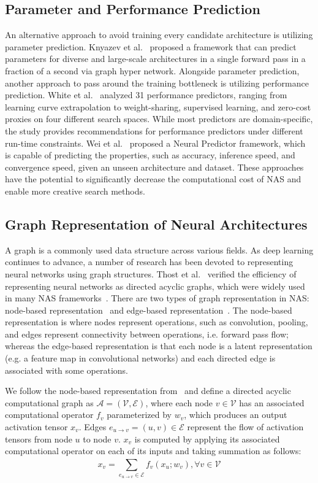 \documentclass{article}
\begin{document}
\subsection{Parameter and Performance Prediction}
An alternative approach to avoid training every candidate architecture is utilizing parameter prediction. Knyazev et al.~\cite{ppuda} proposed a framework that can predict parameters for diverse and large-scale architectures in a single forward pass in a fraction of a second via graph hyper network. Alongside parameter prediction, another approach to pass around the training bottleneck is utilizing performance prediction. White et al.~\cite{performance_predictor} analyzed 31 performance predictors, ranging from learning curve extrapolation to weight-sharing, supervised learning, and zero-cost proxies on four different search spaces. While most predictors are domain-specific, the study provides recommendations for performance predictors under different run-time constraints. Wei et al.~\cite{NeurPred} proposed a Neural Predictor framework, which is capable of predicting the properties, such as accuracy, inference speed, and convergence speed, given an unseen architecture and dataset. These approaches have the potential to significantly decrease the computational cost of NAS and enable more creative search methods. 


\subsection{Graph Representation of Neural Architectures}
A graph is a commonly used data structure across various fields. As deep learning continues to advance, a number of research has been devoted to representing neural networks using graph structures. Thost et al.~\cite{DAG_GNN} verified the efficiency of representing neural networks as directed acyclic graphs, which were widely used in many NAS frameworks~\cite{ppuda, DARTS, GHN}. There are two types of graph representation in NAS: node-based representation~\cite{ppuda, ENAS, GHN} and edge-based representation~\cite{NAS-Bench-Graph, DARTS}. The node-based representation is where nodes represent operations, such as convolution, pooling, and edges represent connectivity between operations, i.e. forward pass flow; whereas the edge-based representation is that each node is a latent representation (e.g. a feature map in convolutional networks) and each directed edge is associated with some operations. 

We follow the node-based representation from~\cite{GHN} and define a directed acyclic computational graph as $\mathcal{A} = (\mathcal{V, E})$, where each node $v \in \mathcal{V}$ has an associated computational operator $f_v$ parameterized by $w_v$, which produces an output activation tensor $x_v$. Edges $e_{u \rightarrow v} = (u, v) \in \mathcal{E}$ represent the flow of activation tensors from node $u$ to node $v$. $x_v$ is computed by applying its associated computational operator on each of its inputs and taking summation as follows: 
\begin{equation}
    x_v = \sum_{e_{u \rightarrow v} \in \mathcal{E}}^{} f_v(x_u; w_v), \forall v \in \mathcal{V}
\end{equation}
\end{document}

